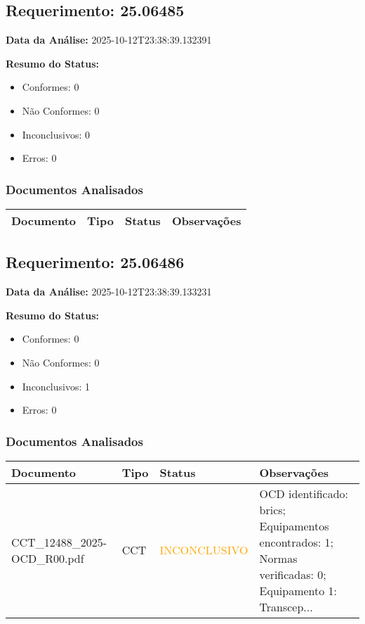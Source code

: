 \documentclass[12pt,a4paper]{article}
\begin{document}
\subsection{Requerimento: 25.06485}

\textbf{Data da Análise:} 2025-10-12T23:38:39.132391

\textbf{Resumo do Status:}
\begin{itemize}
    \item Conformes: 0
    \item Não Conformes: 0
    \item Inconclusivos: 0
    \item Erros: 0
\end{itemize}

\subsubsection{Documentos Analisados}

\begin{longtable}{|p{4cm}|p{2cm}|p{2cm}|p{6cm}|}
\hline
\textbf{Documento} & \textbf{Tipo} & \textbf{Status} & \textbf{Observações} \\
\hline
\endhead
\end{longtable}


\subsection{Requerimento: 25.06486}

\textbf{Data da Análise:} 2025-10-12T23:38:39.133231

\textbf{Resumo do Status:}
\begin{itemize}
    \item Conformes: 0
    \item Não Conformes: 0
    \item Inconclusivos: 1
    \item Erros: 0
\end{itemize}

\subsubsection{Documentos Analisados}

\begin{longtable}{|p{4cm}|p{2cm}|p{2cm}|p{6cm}|}
\hline
\textbf{Documento} & \textbf{Tipo} & \textbf{Status} & \textbf{Observações} \\
\hline
\endhead
CCT\_12488\_2025-OCD\_R00.pdf & CCT & \textcolor{orange}{INCONCLUSIVO} & OCD identificado: brics; Equipamentos encontrados: 1; Normas verificadas: 0; Equipamento 1: Transcep... \\
\hline
\end{longtable}
\end{document}

